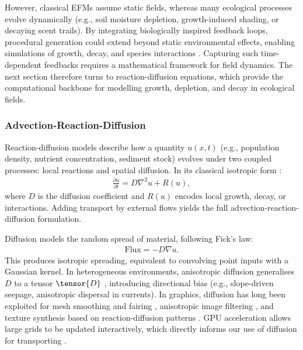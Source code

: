 However, classical EFMs assume static fields, whereas many ecological processes evolve dynamically (e.g., soil moisture depletion, growth-induced shading, or decaying scent trails). By integrating biologically inspired feedback loops, procedural generation could extend beyond static environmental effects, enabling simulations of growth, decay, and species interactions \cite{Okubo2001,Wojtek2022}. Capturing such time-dependent feedbacks requires a mathematical framework for field dynamics. The next section therefore turns to reaction-diffusion equations, which provide the computational backbone for modelling growth, depletion, and decay in ecological fields.









\subsubsection{Advection-Reaction-Diffusion}

Reaction-diffusion models describe how a quantity $u(x,t)$ (e.g., population density, nutrient concentration, sediment stock) evolves under two coupled processes: local reactions and spatial diffusion. In its classical isotropic form \cite{Turing1952,Okubo2001}:
\begin{align}
    \label{eq:reaction-diffusion-classic}
    \frac{\partial u}{\partial t} = D \nabla^2 u + R(u),
\end{align}
where $D$ is the diffusion coefficient and $R(u)$ encodes local growth, decay, or interactions. Adding transport by external flows yields the full advection-reaction-diffusion formulation.

Diffusion models the random spread of material, following Fick's law:
\begin{align}
    \text{Flux} = -D \nabla u.
\end{align}
This produces isotropic spreading, equivalent to convolving point inputs with a Gaussian kernel. In heterogeneous environments, anisotropic diffusion generalises $D$ to a tensor $\tensor{D}$ \cite{Ramos2024}, introducing directional bias (e.g., slope-driven seepage, anisotropic dispersal in currents).  
In graphics, diffusion has long been exploited for mesh smoothing and fairing \cite{Taubin1995}, anisotropic image filtering \cite{Perona1990}, and texture synthesis based on reaction-diffusion patterns \cite{Turk1991}. GPU acceleration allows large grids to be updated interactively, which directly informs our use of diffusion for transporting .

